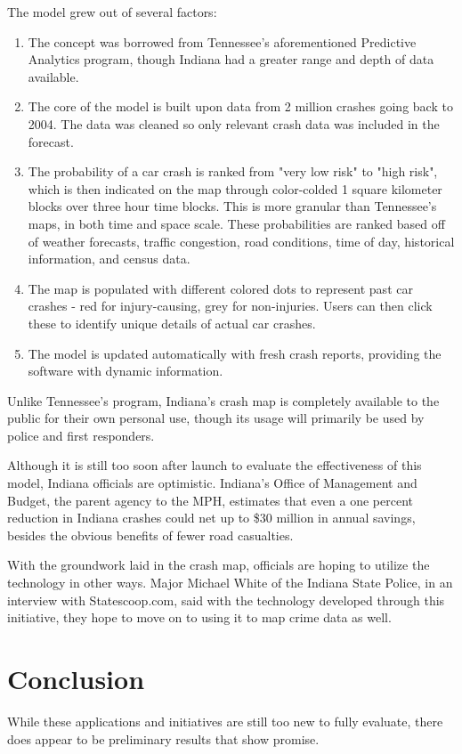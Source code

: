 \documentclass[sigconf]{acmart}
\begin{document}
The model grew out of several factors:
\begin{enumerate}
    \item The concept was borrowed from Tennessee's aforementioned Predictive Analytics program, though Indiana had a greater range and depth of data available. 
    \item The core of the model is built upon data from 2 million crashes going back to 2004. The data was cleaned so only relevant crash data was included in the forecast.
    \item The probability of a car crash is ranked from "very low risk" to "high risk", which is then indicated on the map through color-colded 1 square kilometer blocks over three hour time blocks.\cite{statescoop} This is more granular than Tennessee's maps, in both time and space scale. These probabilities are ranked based off of weather forecasts, traffic congestion, road conditions, time of day, historical information, and census data. 
    \item The map is populated with different colored dots to represent past car crashes - red for injury-causing, grey for non-injuries. Users can then click these to identify unique details of actual car crashes.\cite{govtech}
    \item The model is updated automatically with fresh crash reports, providing the software with dynamic information.
\end{enumerate}

Unlike Tennessee's program, Indiana's crash map is completely available to the public for their own personal use, though its usage will primarily be used by police and first responders. 

Although it is still too soon after launch to evaluate the effectiveness of this model, Indiana officials are optimistic. Indiana's Office of Management and Budget, the parent agency to the MPH, estimates that even a one percent reduction in Indiana crashes could net up to \$30 million in annual savings, besides the obvious benefits of fewer road casualties. 

With the groundwork laid in the crash map, officials are hoping to utilize the technology in other ways. Major Michael White of the Indiana State Police, in an interview with Statescoop.com, said with the technology developed through this initiative, they hope to move on to using it to map crime data as well.\cite{statescoop}

\section{Conclusion}
While these applications and initiatives are still too new to fully evaluate, there does appear to be preliminary results that show promise. 
\end{document}
